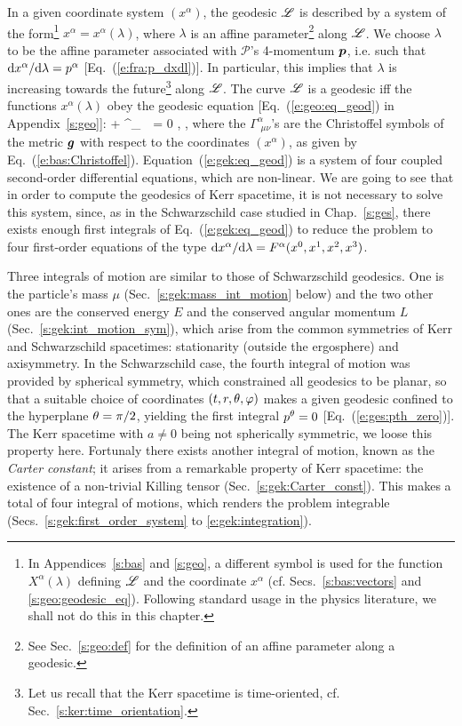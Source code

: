 In a given coordinate system $(x^\alpha)$, the geodesic $\mathscr{L}$ is described
by a system of the form\footnote{In Appendices~\ref{s:bas} and \ref{s:geo},
a different symbol is used for the function $X^\alpha(\lambda)$ defining
$\mathscr{L}$ and the coordinate $x^\alpha$ (cf. Secs.~\ref{s:bas:vectors} and
\ref{s:geo:geodesic_eq}). Following standard usage in the physics literature,
we shall not do this in this chapter.}
$x^\alpha = x^\alpha(\lambda)$, where $\lambda$ is an
affine parameter\footnote{See Sec.~\ref{s:geo:def} for the definition
of an affine parameter along a geodesic.} along $\mathscr{L}$. We choose $\lambda$ to be the affine parameter
associated with $\mathscr{P}$'s 4-momentum $\bm{p}$,
i.e. such that $\mathrm{d} x^\alpha / \mathrm{d}\lambda = p^\alpha$ [Eq.~(\ref{e:fra:p_dxdl})].
In particular, this implies that $\lambda$ is increasing towards the future\footnote{Let us recall that the Kerr spacetime is time-oriented, cf. Sec.~\ref{s:ker:time_orientation}.} along $\mathscr{L}$.
The curve $\mathscr{L}$ is a geodesic iff the functions $x^\alpha(\lambda)$ obey
the geodesic equation [Eq.~(\ref{e:geo:eq_geod}) in Appendix~\ref{s:geo}]:
\be \label{e:gek:eq_geod}
     + \Gamma^\alpha_{\ \, \mu \nu}
      = 0 , \leq \alpha {},
\ee
where the $\Gamma^\alpha_{\ \, \mu \nu}$'s are the Christoffel symbols of the metric $\bm{g}$
with respect to the coordinates $(x^\alpha)$, as given by Eq.~(\ref{e:bas:Christoffel}).
Equation~(\ref{e:gek:eq_geod}) is a system of four coupled second-order
differential equations, which are non-linear. We are going to see that in
order to compute the geodesics of Kerr spacetime, it is not necessary to
solve this system, since, as in the Schwarzschild case studied in Chap.~\ref{s:ges}, there exists
enough first integrals of Eq.~(\ref{e:gek:eq_geod}) to reduce
the problem to four first-order equations
of the type $\mathrm{d} x^\alpha/\mathrm{d}\lambda = F^\alpha(x^0, x^1, x^2, x^3)$.

Three integrals of motion are similar to those of Schwarzschild geodesics.
One is the particle's mass $\mu$ (Sec.~\ref{s:gek:mass_int_motion} below)
and the two other ones are
the conserved energy $E$ and the conserved angular momentum
$L$ (Sec.~\ref{s:gek:int_motion_sym}), which arise from the common symmetries
of Kerr and Schwarzschild spacetimes: stationarity (outside the ergosphere) and axisymmetry.
In the Schwarzschild case, the fourth integral of motion was provided by
spherical symmetry, which constrained all geodesics to be planar, so that
a suitable choice of
coordinates $(t,r,\theta,\varphi)$ makes a given geodesic confined to the
hyperplane $\theta=\pi/2$, yielding the first integral $p^\theta=0$ [Eq.~(\ref{e:ges:pth_zero})].
The Kerr spacetime with $a\not=0$ being not spherically symmetric, we loose
this property here. Fortunaly there exists another
integral of motion, known as the \emph{Carter constant}; it arises from a remarkable property
of Kerr spacetime: the existence of a non-trivial Killing tensor (Sec.~\ref{s:gek:Carter_const}).
This makes a total of four integral of motions,
which renders the problem integrable (Secs.~\ref{s:gek:first_order_system} to
\ref{e:gek:integration}).


